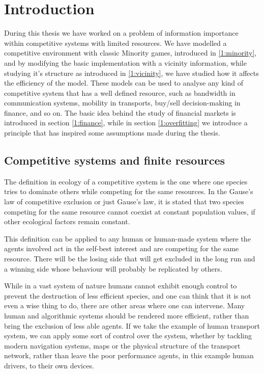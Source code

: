 \chapter{Introduction}

During this thesis we have worked on a problem of information importance within competitive systems with limited resources. 
We have modelled a competitive environment with classic Minority games, introduced in \ref{1:minority}, and by modifying the basic implementation with a vicinity information, while studying it's structure as introduced in \ref{1:vicinity}, we have studied how it affects the efficiency of the model.
These models can be used to analyse any kind of competitive system that has a well defined resource, such as bandwidth in communication systems, mobility in transports, buy/sell decision-making in finance, and so on.
The basic idea behind the study of financial markets is introduced in section \ref{1:finance}, while in section \ref{1:overfitting} we introduce a principle that has inspired some assumptions made during the thesis.

\section{Competitive systems and finite resources}
\label{1:competitive}
The definition in ecology of a competitive system is the one where one species tries to dominate others while competing for the same resources. 
In the Gause's law of competitive exclusion or just Gause's law, \cite{gause1936struggle} it is stated that two species competing for the same resource cannot coexist at constant population values, if other ecological factors remain constant. 

This definition can be applied to any human or human-made system where the agents involved act in the self-best interest and are competing for the same resource.
There will be the losing side that will get excluded in the long run and a winning side whose behaviour will probably be replicated by others.

While in a vast system of nature humans cannot exhibit enough control to prevent the destruction of less efficient species, and one can think that it is not even a wise thing to do, there are other areas where one can intervene.
Many human and algorithmic systems should be rendered more efficient, rather than bring the exclusion of less able agents.
If we take the example of human transport system, we can apply some sort of control over the system, whether by tackling modern navigation systems, maps or the physical structure of the transport network, rather than leave the poor performance agents, in this example human drivers, to their own devices.
	

